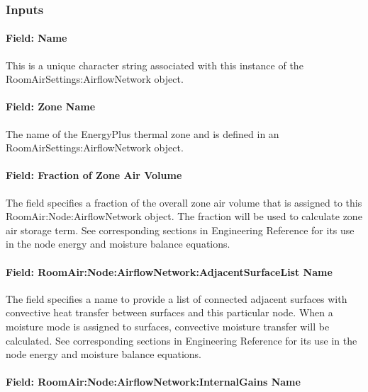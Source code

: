 \subsubsection{Inputs}\label{inputs-13-012}

\paragraph{Field: Name}\label{field-name-8-017}

This is a unique character string associated with this instance of the RoomAirSettings:AirflowNetwork object.

\paragraph{Field: Zone Name}\label{field-zone-name-9-000}

The name of the EnergyPlus thermal zone and is defined in an RoomAirSettings:AirflowNetwork object.

\paragraph{Field: Fraction of Zone Air Volume}\label{field-fraction-of-zone-air-volume}

The field specifies a fraction of the overall zone air volume that is assigned to this RoomAir:Node:AirflowNetwork object. The fraction will be used to calculate zone air storage term. See corresponding sections in Engineering Reference for its use in the node energy and moisture balance equations.

\paragraph{Field: RoomAir:Node:AirflowNetwork:AdjacentSurfaceList Name}\label{field-roomairnodeairflownetworkadjacentsurfacelist-name}

The field specifies a name to provide a list of connected adjacent surfaces with convective heat transfer between surfaces and this particular node. When a moisture mode is assigned to surfaces, convective moisture transfer will be calculated. See corresponding sections in Engineering Reference for its use in the node energy and moisture balance equations.

\paragraph{Field: RoomAir:Node:AirflowNetwork:InternalGains Name}\label{field-roomairnodeairflownetworkinternalgains-name}

